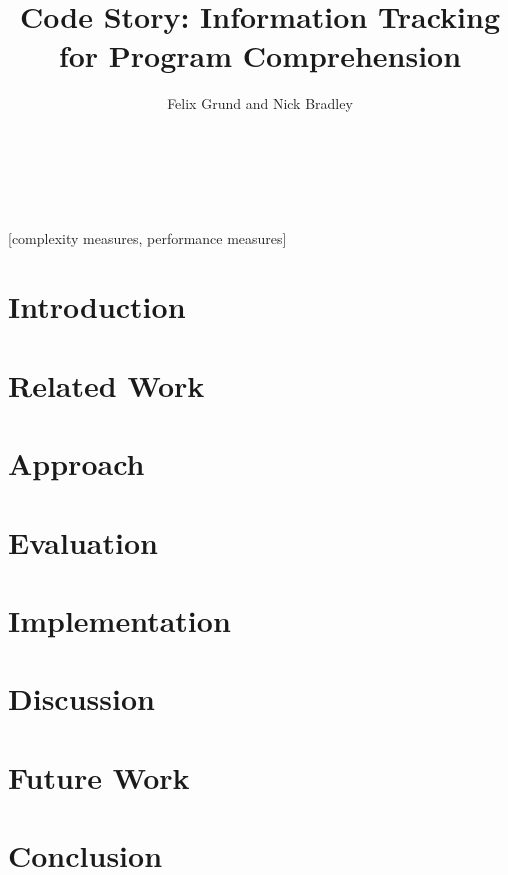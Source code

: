 \documentclass{sig-alternate}
\begin{document}
\title{Code Story: Information Tracking for Program Comprehension}

\author{
\alignauthor
Felix Grund and Nick Bradley \\
       \\
       \\
       \\
}
\maketitle

\begin{abstract}
  
\end{abstract}

[complexity measures, performance measures]



\section{Introduction}
  
\section{Related Work}
  
\section{Approach}
  
\section{Evaluation}
  
\section{Implementation}
  
\section{Discussion}
  
\section{Future Work}
  
\section{Conclusion}
  

  
  
\end{document}
